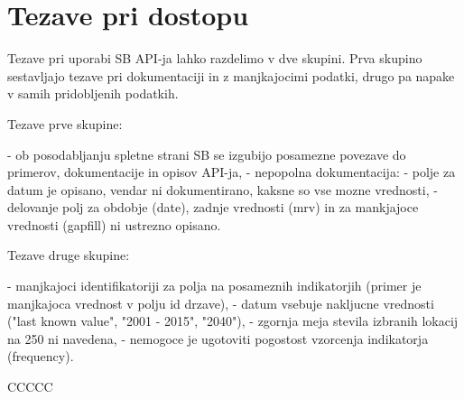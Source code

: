 \section{Tezave pri dostopu}


Tezave pri uporabi SB API-ja lahko razdelimo v dve skupini. Prva skupino
sestavljajo tezave pri dokumentaciji in z manjkajocimi podatki, drugo pa
napake v samih pridobljenih podatkih.

Tezave prve skupine:

- ob posodabljanju spletne strani SB se izgubijo posamezne povezave do 
  primerov, dokumentacije in opisov API-ja,
- nepopolna dokumentacija:
  - polje za datum je opisano, vendar ni dokumentirano, kaksne so vse mozne 
    vrednosti,
  - delovanje polj za obdobje (date), zadnje vrednosti (mrv) in za mankjajoce
    vrednosti (gapfill) ni ustrezno opisano.

Tezave druge skupine:


- manjkajoci identifikatoriji za polja na posameznih indikatorjih (primer je
  manjkajoca vrednost v polju id drzave),
- datum vsebuje nakljucne vrednosti ("last known value", "2001 - 2015", "2040"),
- zgornja meja stevila izbranih lokacij na 250 ni navedena,
- nemogoce je ugotoviti pogostost vzorcenja indikatorja (frequency).





CCCCC
